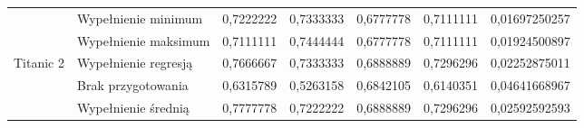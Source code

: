 \documentclass{book}
\begin{document}
\begin{table}[H]
\begin{tabular}{|l|l|r|r|r|r|r|}
                                & Wypełnienie minimum  & 0,7222222                                                                        & 0,7333333                                                                                & 0,6777778                                                                                          & 0,7111111                                                                       & 0,01697250257                                                                    \\ \cline{2-7} 
                                & Wypełnienie maksimum & 0,7111111                                                                        & \cellcolor[HTML]{67FD9A}0,7444444                                                        & 0,6777778                                                                                          & 0,7111111                                                                       & 0,01924500897                                                                    \\ \cline{2-7} 
    \multirow{-5}{*}{Titanic 2} & Wypełnienie regresją & \cellcolor[HTML]{67FD9A}0,7666667                                                & 0,7333333                                                                                & \cellcolor[HTML]{67FD9A}0,6888889                                                                  & \cellcolor[HTML]{FFCC67}0,7296296                                               & \cellcolor[HTML]{FFCC67}0,02252875011                                            \\ \hline
                                & Brak przygotowania   & 0,6315789                                                                        & 0,5263158                                                                                & 0,6842105                                                                                          & 0,6140351                                                                       & 0,04641668967                                                                    \\ \cline{2-7} 
                                & Wypełnienie średnią  & 0,7777778                                                                        & 0,7222222                                                                                & \cellcolor[HTML]{67FD9A}0,6888889                                                                  & \cellcolor[HTML]{FFCC67}0,7296296                                               & \cellcolor[HTML]{FFCC67}0,02592592593                                            \\ \cline{2-7} 

\end{tabular}
\end{table}
\end{document}
